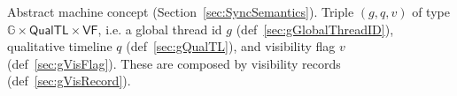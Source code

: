 
Abstract machine concept (Section~\ref{sec:SyncSemantics}).
Triple $(g, q, v)$ of type $\mathbb{G} \times \mathsf{QualTL} \times \mathsf{VF}$, i.e. a global thread id $g$ (def~\ref{sec:gGlobalThreadID}), qualitative timeline $q$ (def~\ref{sec:gQualTL}), and visibility flag $v$ (def~\ref{sec:gVisFlag}).
These are composed by visibility records (def~\ref{sec:gVisRecord}).

